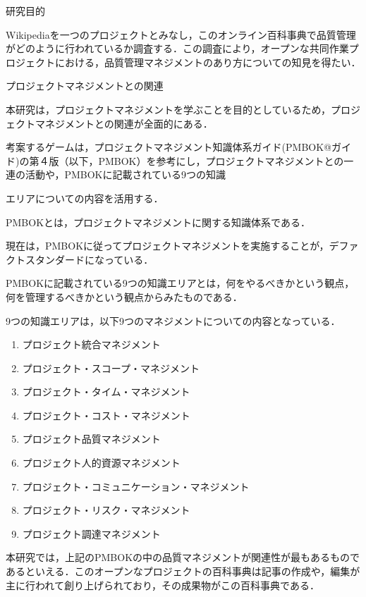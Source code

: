 研究目的

Wikipediaを一つのプロジェクトとみなし，このオンライン百科事典で品質管理がどのように行われているか調査する．この調査により，オープンな共同作業プロジェクトにおける，品質管理マネジメントのあり方についての知見を得たい．


プロジェクトマネジメントとの関連

本研究は，プロジェクトマネジメントを学ぶことを目的としているため，プロジェクトマネジメントとの関連が全面的にある．

考案するゲームは，プロジェクトマネジメント知識体系ガイド(PMBOK@ガイド)の第４版（以下，PMBOK）を参考にし，プロジェクトマネジメントとの一連の活動や，PMBOKに記載されている9つの知識

エリアについての内容を活用する．

PMBOKとは，プロジェクトマネジメントに関する知識体系である．

現在は，PMBOKに従ってプロジェクトマネジメントを実施することが，デファクトスタンダードになっている．

PMBOKに記載されている9つの知識エリアとは，何をやるべきかという観点，何を管理するべきかという観点からみたものである．

9つの知識エリアは，以下9つのマネジメントについての内容となっている．


\begin{enumerate}
 \item プロジェクト統合マネジメント
 \item プロジェクト・スコープ・マネジメント
 \item プロジェクト・タイム・マネジメント
 \item プロジェクト・コスト・マネジメント
 \item プロジェクト品質マネジメント
 \item プロジェクト人的資源マネジメント
 \item プロジェクト・コミュニケーション・マネジメント
 \item プロジェクト・リスク・マネジメント
 \item プロジェクト調達マネジメント
\end{enumerate}








本研究では，上記のPMBOKの中の品質マネジメントが関連性が最もあるものであるといえる．このオープンなプロジェクトの百科事典は記事の作成や，編集が主に行われて創り上げられており，その成果物がこの百科事典である．


